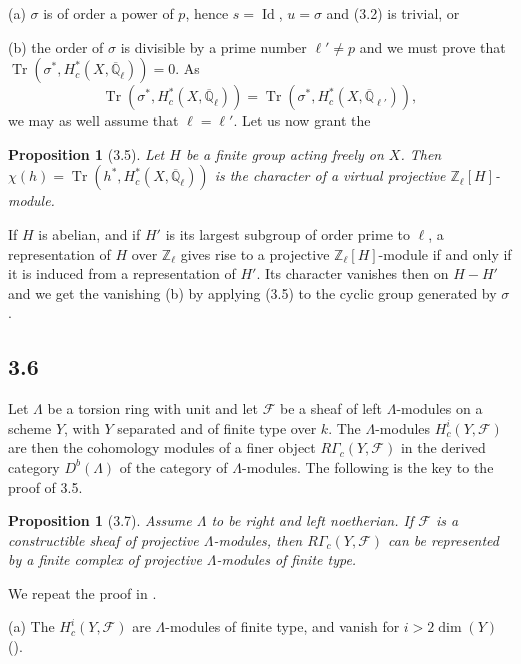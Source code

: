 \documentclass[11pt]{amsart}
\theoremstyle{plain}
\newtheorem{proposition}[theorem]{Proposition}
\theoremstyle{remark}
\DeclareMathOperator{\Tr}{Tr}
\DeclareMathOperator{\id}{Id}
\begin{document}
(a) $\sigma$ is of order a power of $p$, hence $s = \id$, $u = \sigma$ and (3.2) is trivial, or

(b) the order of $\sigma$ is divisible by a prime number $\ell' \neq p$ and we must prove that $\Tr(\sigma^*, H_c^*(X, \overline{\mathbb{Q}}_\ell)) = 0$. As
\begin{equation}\label{eq:3.3}
\Tr(\sigma^*, H_c^*(X, \overline{\mathbb{Q}}_\ell)) = \Tr(\sigma^*, H_c^*(X, \overline{\mathbb{Q}}_{\ell'})),
\end{equation}
we may as well assume that $\ell = \ell'$. Let us now grant the

\begin{proposition}[3.5]
Let $H$ be a finite group acting freely on $X$. Then $\chi(h) = \Tr(h^*, H_c^*(X, \overline{\mathbb{Q}}_\ell))$ is the character of a virtual projective $\mathbb{Z}_\ell[H]$-module.
\end{proposition}

If $H$ is abelian, and if $H'$ is its largest subgroup of order prime to $\ell$, a representation of $H$ over $\mathbb{Z}_\ell$ gives rise to a projective $\mathbb{Z}_\ell[H]$-module if and only if it is induced from a representation of $H'$. Its character vanishes then on $H - H'$ and we get the vanishing (b) by applying (3.5) to the cyclic group generated by $\sigma$.

\subsection{3.6} Let $\Lambda$ be a torsion ring with unit and let $\mathcal{F}$ be a sheaf of left $\Lambda$-modules on a scheme $Y$, with $Y$ separated and of finite type over $k$. The $\Lambda$-modules $H_c^i(Y, \mathcal{F})$ are then the cohomology modules of a finer object $R\Gamma_c(Y, \mathcal{F})$ in the derived category $D^b(\Lambda)$ of the category of $\Lambda$-modules. The following is the key to the proof of 3.5.

\begin{proposition}[3.7]
Assume $\Lambda$ to be right and left noetherian. If $\mathcal{F}$ is a constructible sheaf of projective $\Lambda$-modules, then $R\Gamma_c(Y, \mathcal{F})$ can be represented by a finite complex of projective $\Lambda$-modules of finite type.
\end{proposition}

We repeat the proof in \cite[XVII (5.2.10)]{SGA4}.

(a) The $H_c^i(Y, \mathcal{F})$ are $\Lambda$-modules of finite type, and vanish for $i > 2\dim(Y)$ (\cite[XVII (5.2.8.1) and (5.3.6)]{SGA4}).
\end{document}
